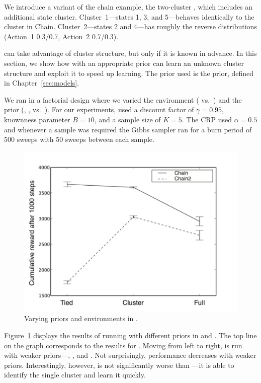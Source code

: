 We introduce a variant of the chain example, the two-cluster ,
which includes an additional state cluster.  Cluster~1---states 1, 3,
and 5---behaves identically to the cluster in Chain.
Cluster~2---states 2 and 4---has roughly the reverse
distributions (Action~1 0.3/0.7, Action~2 0.7/0.3).

 can take advantage of
cluster structure, but only if it is known in advance.  In this
section, we show how  with an appropriate prior can learn an
unknown cluster structure and exploit it to speed up learning. The prior used is the  prior, defined in Chapter~\ref{sec:models}.


We ran  in a factorial design where we varied the environment
( vs.\ ) and the prior (, , vs.\ ).  For our
experiments,  used a discount factor of $\gamma = 0.95$,
knownness parameter $B=10$, and a sample size of $K=5$.  The
 CRP used $\alpha=0.5$ and whenever a
sample was required the Gibbs sampler ran for a burn period of 500
sweeps with 50 sweeps between each sample.

\begin{figure}[t]
\begin{center}
\includegraphics[width=1.0\linewidth]{figures/2x3}
\caption{Varying priors and environments in .}
\label{f:twobythree}
\end{center}
\end{figure}

Figure~\ref{f:twobythree} displays the results of running  with
different priors in  and .  The top line on the graph
corresponds to the results for .  Moving from left to right, 
is run with weaker priors---, , and .  Not
surprisingly, performance decreases with weaker priors.
Interestingly, however,  is not significantly worse than
---it is able to identify the single cluster and learn it quickly.

